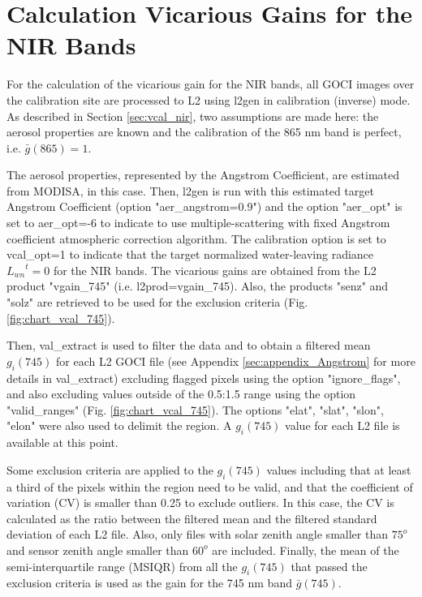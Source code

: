 \documentclass[10pt]{article}
\begin{document}
\section{Calculation Vicarious Gains for the NIR Bands}\label{sec:appendix_NIR}
For the calculation of the vicarious gain for the NIR bands, all GOCI images over the calibration site are processed to L2 using l2gen in calibration (inverse) mode. As described in Section \ref{sec:vcal_nir}, two assumptions are made here: the aerosol properties are known and the calibration of the 865 nm band is perfect, i.e. $\bar{g}(865)=1$. 

The aerosol properties, represented by the Angstrom Coefficient, are estimated from MODISA, in this case. Then, l2gen is run with this estimated target Angstrom Coefficient (option "aer\_angstrom=0.9") and the option "aer\_opt" is set to aer\_opt=-6 to indicate to use multiple-scattering with fixed Angstrom coefficient atmospheric correction algorithm. The calibration option is set to vcal\_opt=1 to indicate that the target normalized water-leaving radiance ${L_{wn}}^t = 0$ for the NIR bands. The vicarious gains are obtained from the L2 product "vgain\_745" (i.e. l2prod=vgain\_745). Also, the products "senz" and "solz" are retrieved to be used for the exclusion criteria (Fig. \ref{fig:chart_vcal_745}). 

Then, val\_extract is used to filter the data and to obtain a filtered mean $g_i(745)$ for each L2 GOCI file (see Appendix \ref{sec:appendix_Angstrom} for more details in val\_extract) excluding flagged pixels using the option "ignore\_flags", and also excluding values outside of the 0.5:1.5 range using the option "valid\_ranges" (Fig. \ref{fig:chart_vcal_745}).  The options "elat", "slat", "slon", "elon" were also used to delimit the region. A $g_i(745)$ value for each L2 file is available at this point.

Some exclusion criteria are applied to the $g_i(745)$ values including that at least a third of the pixels within the region need to be valid, and that the coefficient of variation (CV) is smaller than 0.25 to exclude outliers. In this case, the CV is calculated as the ratio between the filtered mean and the filtered standard deviation of each L2 file. Also, only files with solar zenith angle smaller than $75^o$ and sensor zenith angle smaller than $60^o$ are included. Finally, the mean of the semi-interquartile range (MSIQR) from all the $g_i(745)$ that passed the exclusion criteria is used as the gain for the 745 nm band $\bar{g}(745)$.
\end{document}

